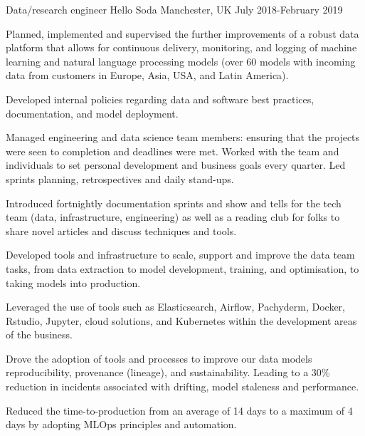 \begin{cventries}
\cventry
{Data/research engineer} %
{Hello Soda } %
{Manchester, UK} %
{July 2018-February 2019 } %
{ %
\begin{cvitems}
\item {Planned, implemented and supervised the further improvements of a robust data platform that allows for continuous delivery, monitoring, and logging of machine learning and natural language processing models (over 60 models with incoming data from customers in Europe, Asia, USA, and Latin America).}
\item{Developed internal policies regarding data and software best practices, documentation, and model deployment.}
\item{Managed engineering and data science team members: ensuring that the projects were seen to completion and deadlines were met. Worked with the team and individuals to set personal development and business goals every quarter. Led sprints planning, retrospectives and daily stand-ups.}
\item{Introduced fortnightly documentation sprints and show and tells for the tech team (data, infrastructure, engineering) as well as a reading club for folks to share novel articles and discuss techniques and tools.} 
\item{Developed tools and infrastructure to scale, support and improve the data team tasks, from data extraction to model development, training, and optimisation, to taking models into production.}
\item{Leveraged the use of tools such as Elasticsearch, Airflow, Pachyderm, Docker, Rstudio, Jupyter, cloud solutions, and Kubernetes within the development areas of the business.}
\item{Drove the adoption of tools and processes to improve our data models reproducibility, provenance (lineage), and sustainability. Leading to a 30\% reduction in incidents associated with drifting, model staleness and performance.}
\item {Reduced the time-to-production from an average of 14 days to a maximum of 4 days by adopting MLOps principles and automation.}
\end{cvitems}
}



\end{cventries}
